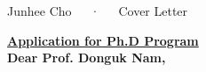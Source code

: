 \documentclass[11pt, a4paper]{awesome-cv}
\begin{document}
\makecvheader[R]
\vspace{-15mm}
\makecvfooter
  {}
  {Junhee Cho~~~·~~~Cover Letter}
  {}

\vspace{14 mm}
\underline{\textbf{Application for Ph.D Program}}\\
\textbf{Dear Prof. Donguk Nam,}
\vspace{-1 mm}
\end{document}
